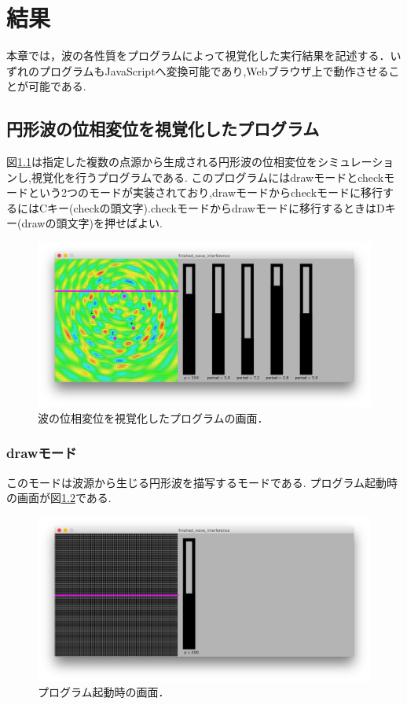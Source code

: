 \chapter{結果}
本章では，波の各性質をプログラムによって視覚化した実行結果を記述する．いずれのプログラムもJavaScriptへ変換可能であり,Webブラウザ上で動作させることが可能である.

\section{円形波の位相変位を視覚化したプログラム}
図\ref{fig:4wave}は指定した複数の点源から生成される円形波の位相変位をシミュレーションし,視覚化を行うプログラムである.
このプログラムにはdrawモードとcheckモードという2つのモードが実装されており,drawモードからcheckモードに移行するにはCキー(checkの頭文字).checkモードからdrawモードに移行するときはDキー(drawの頭文字)を押せばよい.


\begin{figure}[htbp]
 \begin{center}
  \includegraphics[width=\linewidth]{../result/4wave.png}
 \end{center}
 \caption{波の位相変位を視覚化したプログラムの画面．}
 \label{fig:4wave}
\end{figure}






\subsection{drawモード}
このモードは波源から生じる円形波を描写するモードである. プログラム起動時の画面が図\ref{fig:0wave}である.
\begin{figure}[htbp]
 \begin{center}
  \includegraphics[width=\linewidth]{../result/0wave.png}
 \end{center}
 \caption{プログラム起動時の画面．}
 \label{fig:0wave}
\end{figure}

